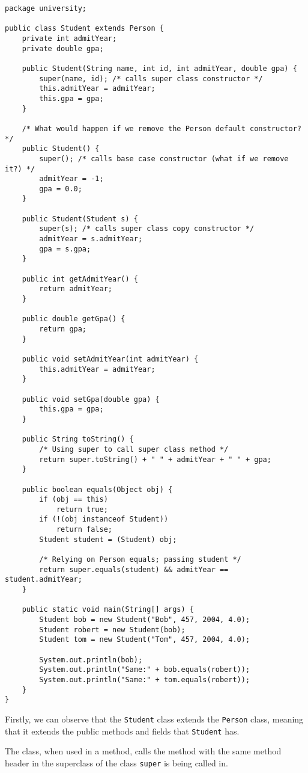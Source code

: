 \begin{lstlisting}
package university;

public class Student extends Person {
	private int admitYear;
	private double gpa;

	public Student(String name, int id, int admitYear, double gpa) {
		super(name, id); /* calls super class constructor */
		this.admitYear = admitYear;
		this.gpa = gpa;
	}

	/* What would happen if we remove the Person default constructor? */
	public Student() {
		super(); /* calls base case constructor (what if we remove it?) */
		admitYear = -1;
		gpa = 0.0;
	}

	public Student(Student s) {
		super(s); /* calls super class copy constructor */
		admitYear = s.admitYear;
		gpa = s.gpa;
	}

	public int getAdmitYear() {
		return admitYear;
	}

	public double getGpa() {
		return gpa;
	}

	public void setAdmitYear(int admitYear) {
		this.admitYear = admitYear;
	}

	public void setGpa(double gpa) {
		this.gpa = gpa;
	}

	public String toString() {
		/* Using super to call super class method */
		return super.toString() + " " + admitYear + " " + gpa;
	}

	public boolean equals(Object obj) {
		if (obj == this)
			return true;
		if (!(obj instanceof Student))
			return false;
		Student student = (Student) obj;

		/* Relying on Person equals; passing student */
		return super.equals(student) && admitYear == student.admitYear;
	}

	public static void main(String[] args) {
		Student bob = new Student("Bob", 457, 2004, 4.0);
		Student robert = new Student(bob);
		Student tom = new Student("Tom", 457, 2004, 4.0);

		System.out.println(bob);
		System.out.println("Same:" + bob.equals(robert));
		System.out.println("Same:" + tom.equals(robert));
	}
}
\end{lstlisting}

Firstly, we can observe that the \verb!Student! class extends the \verb!Person! class, meaning that it extends the public methods and fields that \verb!Student! has. 

The  class, when used in a method, calls the method with the same method header in the superclass of the class \verb!super! is being called in. 


